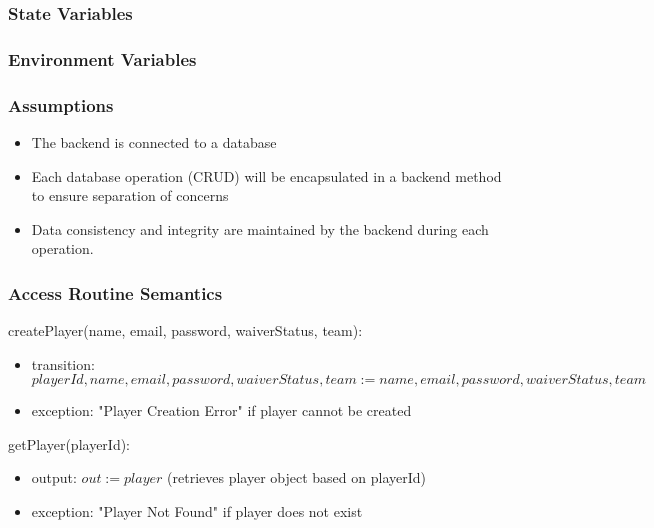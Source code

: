 \documentclass[12pt, titlepage]{article}
\begin{document}
\subsubsection{State Variables}


\subsubsection{Environment Variables}


\subsubsection{Assumptions}

\begin{itemize}
  \item The backend is connected to a database
  \item Each database operation (CRUD) will be encapsulated in a backend method to ensure separation of concerns
  \item Data consistency and integrity are maintained by the backend during each operation.
  
\end{itemize}

\subsubsection{Access Routine Semantics}

\noindent createPlayer(name, email, password, waiverStatus, team):
\begin{itemize}
\item transition: $playerId, name, email, password, waiverStatus, team := name, email, password, waiverStatus, team$
\item exception: "Player Creation Error" if player cannot be created
\end{itemize}

\noindent getPlayer(playerId):
\begin{itemize}
\item output: $out := player$ (retrieves player object based on playerId)
\item exception: "Player Not Found" if player does not exist
\end{itemize}
\end{document}
